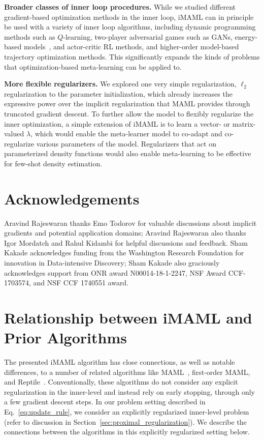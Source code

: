 \documentclass{article} \usepackage[nonatbib, final]{mod_neurips}
\begin{document}
\textbf{Broader classes of inner loop procedures.} While we studied different gradient-based optimization methods in the inner loop, iMAML can in principle be used with a variety of inner loop algorithms, including dynamic programming methods such as $Q$-learning, two-player adversarial games such as GANs, energy-based models~\cite{Mordatch18concept}, and actor-critic RL methods, and higher-order model-based trajectory optimization methods.
This significantly expands the kinds of problems that optimization-based meta-learning can be applied to.

\textbf{More flexible regularizers.} We explored one very simple regularization, $\ell_2$ regularization to the parameter initialization, which already increases the expressive power over the implicit regularization that MAML provides through truncated gradient descent. To further allow the model to flexibly regularize the inner optimization, a simple extension of iMAML is to learn a vector- or matrix-valued $\lambda$, which would enable the meta-learner model to co-adapt and co-regularize various parameters of the model. Regularizers that act on parameterized density functions would also enable meta-learning to be effective for few-shot density estimation.

\clearpage

\section*{Acknowledgements}
Aravind Rajeswaran thanks Emo Todorov for valuable discussions about implicit gradients and potential application domains; Aravind Rajeswaran also thanks Igor Mordatch and Rahul Kidambi for helpful discussions and feedback. Sham Kakade acknowledges funding from the Washington Research Foundation for innovation in Data-intensive Discovery; Sham Kakade also graciously acknowledges support from ONR award N00014-18-1-2247, NSF Award CCF-1703574, and NSF CCF 1740551 award.





\clearpage

\appendix


\section{Relationship between iMAML and Prior Algorithms}
\label{app:other_algs}

The presented iMAML algorithm has close connections, as well as notable differences, to a number of related algorithms like MAML~\cite{maml}, first-order MAML, and Reptile~\cite{nichol2018first}. Conventionally, these algorithms do not consider any explicit regularization in the inner-level and instead rely on early stopping, through only a few gradient descent steps. In our problem setting described in Eq.~\ref{eq:update_rule}, we consider an explicitly regularized inner-level problem (refer to discussion in Section~\ref{sec:proximal_regularization}). We describe the connections between the algorithms in this explicitly regularized setting below.
\end{document}
